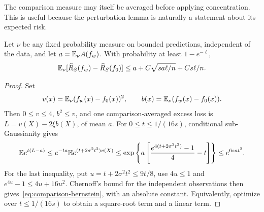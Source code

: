 The comparison measure may itself be averaged before applying concentration. This is useful because the perturbation lemma is naturally a statement about its expected risk.

\begin{lemma}\label{lem:comparison-concentration}
Let $\nu$ be any fixed probability measure on bounded predictions, independent of the data, and let $a=\mathbb E_\nu A(f_w)$. With probability at least $1-e^{-\ell}$,
\begin{equation}
 \mathbb E_\nu[\widehat R_S(f_w)-\widehat R_S(f_0)]
 \le a+C\sqrt{sa\ell/n}+Cs\ell/n.
 \label{eq:comparison-bernstein}
\end{equation}
\end{lemma}
\begin{proof}
Set
\[
 v(x)=\mathbb E_\nu(f_w(x)-f_0(x))^2,\qquad
 b(x)=\mathbb E_\nu(f_w(x)-f_0(x)).
\]
Then $0\le v\le4$, $b^2\le v$, and one comparison-averaged excess loss is $L=v(X)-2\xi b(X)$, of mean $a$. For $0\le t\le1/(16s)$, conditional sub-Gaussianity gives
\[
 \mathbb E e^{t(L-a)}
 \le e^{-ta}\mathbb E e^{(t+2\sigma^2t^2)v(X)}
 \le\exp\left\{a\left[\frac{e^{4(t+2\sigma^2t^2)}-1}{4}-t\right]\right\}
 \le e^{6sa t^2}.
\]
For the last inequality, put $u=t+2\sigma^2t^2\le9t/8$, use $4u\le1$ and $e^{4u}-1\le4u+16u^2$. Chernoff's bound for the independent observations then gives~\eqref{eq:comparison-bernstein}, with an absolute constant. Equivalently, optimize over $t\le1/(16s)$ to obtain a square-root term and a linear term.
\end{proof}

